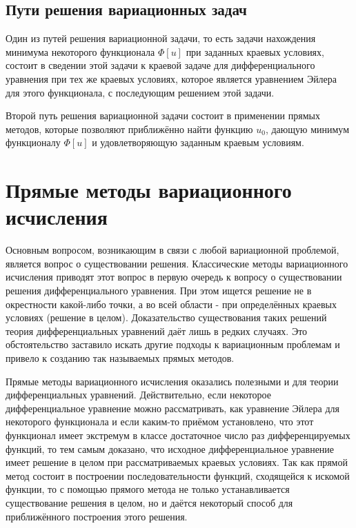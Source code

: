 \documentclass{article}
\begin{document}
\subsection{Пути решения вариационных задач}

Один из путей решения вариационной задачи, то есть задачи нахождения минимума некоторого функционала $\Phi[u]$ при заданных краевых условиях, состоит в сведении этой задачи к краевой задаче для дифференциального уравнения при тех же краевых условиях, которое является уравнением Эйлера для этого функционала, с последующим решением этой задачи.

Второй путь решения вариационной задачи состоит в применении прямых методов, которые позволяют приближённо найти функцию $u_{0}$, дающую минимум функционалу $\Phi[u]$ и удовлетворяющую заданным краевым условиям.


\newpage

\section{Прямые методы вариационного исчисления}

Основным вопросом, возникающим в связи с любой вариационной проблемой, является вопрос о существовании решения. Классические методы вариационного исчисления приводят этот вопрос в первую очередь к вопросу о существовании решения дифференциального уравнения. При этом ищется решение не в окрестности какой-либо точки, а во всей области - при определённых краевых условиях (решение в целом). Доказательство существования таких решений теория дифференциальных уравнений даёт лишь в редких случаях. Это обстоятельство заставило искать другие подходы к вариационным проблемам и привело к созданию так называемых прямых методов.

Прямые методы вариационного исчисления оказались полезными и для теории дифференциальных уравнений. Действительно, если некоторое дифференциальное уравнение можно рассматривать, как уравнение Эйлера для некоторого функционала и если каким-то приёмом установлено, что этот функционал имеет экстремум в классе достаточное число раз дифференцируемых функций, то тем самым доказано, что исходное дифференциальное уравнение имеет решение в целом при рассматриваемых краевых условиях. Так как прямой метод состоит в построении последовательности функций, сходящейся к искомой функции, то с помощью прямого метода не только устанавливается существование решения в целом, но и даётся некоторый способ для приближённого построения этого решения.
\end{document}
